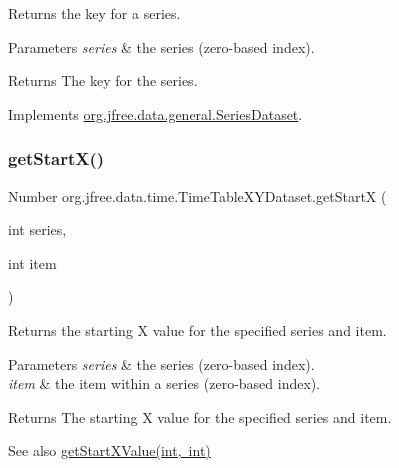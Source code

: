 Returns the key for a series.


\begin{DoxyParams}{Parameters}
{\em series} & the series (zero-\/based index).\\
\hline
\end{DoxyParams}
\begin{DoxyReturn}{Returns}
The key for the series. 
\end{DoxyReturn}


Implements \mbox{\hyperlink{interfaceorg_1_1jfree_1_1data_1_1general_1_1_series_dataset_a60488892b2314a05a012999e26a74178}{org.\+jfree.\+data.\+general.\+Series\+Dataset}}.

\mbox{\label{classorg_1_1jfree_1_1data_1_1time_1_1_time_table_x_y_dataset_a9af3bf40e3d723b5aad9470417154183}} 
\subsubsection{\texorpdfstring{get\+Start\+X()}{getStartX()}}
{\footnotesize\ttfamily Number org.\+jfree.\+data.\+time.\+Time\+Table\+X\+Y\+Dataset.\+get\+StartX (\begin{DoxyParamCaption}\item[{int}]{series,  }\item[{int}]{item }\end{DoxyParamCaption})}

Returns the starting X value for the specified series and item.


\begin{DoxyParams}{Parameters}
{\em series} & the series (zero-\/based index). \\
\hline
{\em item} & the item within a series (zero-\/based index).\\
\hline
\end{DoxyParams}
\begin{DoxyReturn}{Returns}
The starting X value for the specified series and item.
\end{DoxyReturn}
\begin{DoxySeeAlso}{See also}
\mbox{\hyperlink{classorg_1_1jfree_1_1data_1_1time_1_1_time_table_x_y_dataset_a0173db781cf6ea359c9937b4bbac4dd1}{get\+Start\+X\+Value(int, int)}} 
\end{DoxySeeAlso}


